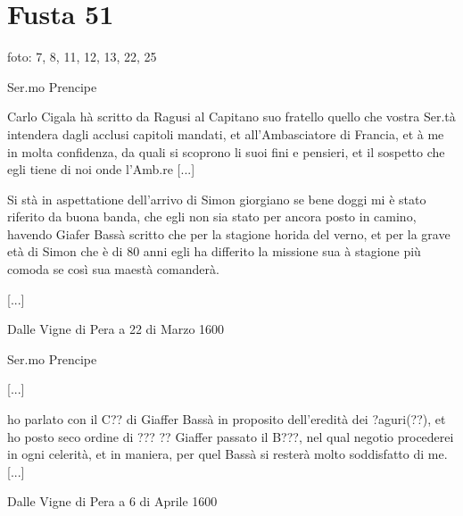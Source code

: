 \section{Fusta 51}

foto: 7, 8, 11, 12, 13, 22, 25

\setcounter{docnumber}{6}



\begin{center}
Ser.mo Prencipe
\end{center}

Carlo Cigala hà scritto da  Ragusi al Capitano suo fratello quello che
vostra   Ser.tà   intendera  dagli   acclusi   capitoli  mandati,   et
all'Ambasciatore di Francia, et à  me in molta confidenza, da quali si
scoprono li suoi fini e pensieri, et il sospetto che egli tiene di noi
onde l'Amb.re [...]

Si stà in aspettatione dell'arrivo di Simon giorgiano se bene doggi mi
è stato  riferito da buona  banda, che egli  non sia stato  per ancora
posto  in camino,  havendo Giafer  Bassà scritto  che per  la stagione
horida del verno, et  per la grave età di Simon che  è di 80 anni egli
ha differito la missione sua à  stagione più comoda se così sua maestà
comanderà.

[...]

Dalle Vigne di Pera a 22 di Marzo 1600


\setcounter{docnumber}{10}


\begin{center}
Ser.mo Prencipe
\end{center}

[...]

ho parlato con  il C?? di Giaffer Bassà  in proposito dell'eredità dei
?aguri(??), et ho posto seco ordine di ??? ?? Giaffer passato il B???,
nel qual negotio procederei in  ogni celerità, et in maniera, per quel
Bassà si resterà molto soddisfatto di me. [...]

Dalle Vigne di Pera a 6 di Aprile 1600


\setcounter{docnumber}{21}

